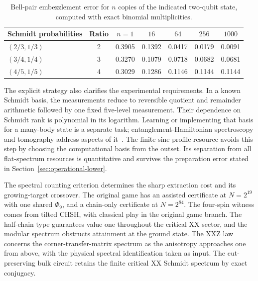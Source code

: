 \begin{table}[htb]
\centering\small
\begin{tabular}{@{}lcccccc@{}}
\toprule
Schmidt probabilities & Ratio & $n=1$ & $16$ & $64$ & $256$ & $1000$\\
\midrule
$(2/3,1/3)$ & 2 & 0.3905 & 0.1392 & 0.0417 & 0.0179 & 0.0091 \\
$(3/4,1/4)$ & 3 & 0.3270 & 0.1079 & 0.0718 & 0.0682 & 0.0681 \\
$(4/5,1/5)$ & 4 & 0.3029 & 0.1286 & 0.1146 & 0.1144 & 0.1144 \\
\bottomrule
\end{tabular}
\caption{Bell-pair embezzlement error for $n$ copies of the indicated
two-qubit state, computed with exact binomial multiplicities.}\label{tab:pairs}
\end{table}

The explicit strategy also clarifies the experimental requirements. In a
known Schmidt basis, the measurements reduce to reversible quotient and
remainder arithmetic followed by one fixed five-level measurement.
Their dependence on Schmidt rank is polynomial in its logarithm. Learning
or implementing that basis for a many-body state is a separate task;
entanglement-Hamiltonian spectroscopy and tomography address aspects of
it~\cite{Dalmonte18,Kokail21}. The finite sine-profile resource avoids
this step by choosing the computational basis from the outset.
Its separation from all flat-spectrum resources is quantitative and
survives the preparation error stated in Section~\ref{sec:operational-lower}.

The spectral counting criterion determines the sharp extraction cost and
its growing-target crossover. The original game has an assisted
certificate at $N=2^{19}$ with one shared $\Phi_9$, and a chain-only
certificate at $N=2^{84}$. The four-spin witness comes from tilted CHSH,
with classical play in the original game branch. The half-chain type
guarantees value one throughout the critical XX sector, and the modular
spectrum obstructs attainment at the ground state. The XXZ law concerns
the corner-transfer-matrix spectrum as the anisotropy approaches one
from above, with the physical spectral identification taken as input.
The cut-preserving bulk circuit retains
the finite critical XX Schmidt spectrum by exact conjugacy.

